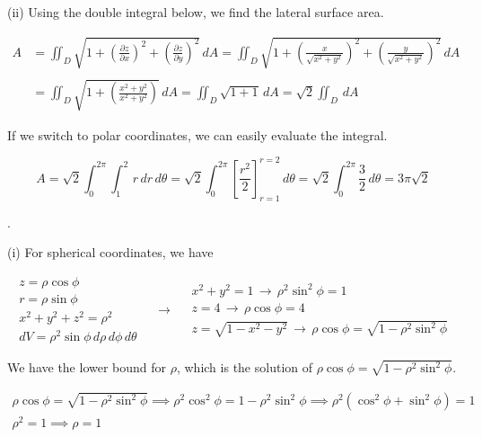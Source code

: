 \documentclass{article}
\begin{document}
\hfill

\noindent (ii) Using the double integral below, we find the lateral surface area.

\begin{align*}
A&=\iint_D\sqrt{1+\left(\frac{\partial z}{\partial x}\right)^2 +\left(\frac{\partial z}{\partial y}\right)^2}\,dA= \iint_D\sqrt{1+\left(\frac{x}{\sqrt{x^2+y^2}}\right)^2 +\left(\frac{y}{\sqrt{x^2+y^2}}\right)^2}\,dA \\\\&=\iint_D\sqrt{1+\left(\frac{x^2+y^2}{x^2+y^2}\right)}\,dA=\iint_D\sqrt{1+1}\,dA=\sqrt{2}\iint_D\,dA
\end{align*}

\hfill

\noindent If we switch to polar coordinates, we can easily evaluate the integral.

\begin{equation*}A=\sqrt2\int_0^{2\pi}\int_1^2\,r\,dr\,d\theta=\sqrt2\int_0^{2\pi}\left[\frac{r^2}2\right]_{r=1}^{r=2}\,d\theta=\sqrt2\int_0^{2\pi}\frac32\,d\theta=\boxed{3\pi\sqrt2}\end{equation*}

\newpage

.

\hfill

\noindent (i) For spherical coordinates, we have

\[
\begin{array}{c}
z=\rho\cos\phi\\
r=\rho\sin\phi\\
x^2+y^2+z^2=\rho^2\\
dV=\rho^2\sin\phi\,d\rho\,d\phi\,d\theta
\end{array}\quad\rightarrow\quad
\begin{array}{c}
x^2+y^2=1\,\rightarrow\,\rho^2\sin^2\phi = 1\\
z=4\,\rightarrow\,\rho\cos\phi=4\\
z=\sqrt{1-x^2-y^2}\,\rightarrow\,\rho\cos\phi=\sqrt{1-\rho^2\sin^2\phi}
\end{array}
\]

\hfill

\noindent We have the lower bound for $\rho$, which is the solution of $\rho\cos\phi=\sqrt{1-\rho^2\sin^2\phi}$.

\[
\begin{array}{c}
\rho\cos\phi=\sqrt{1-\rho^2\sin^2\phi}\implies\rho^2\cos^2\phi=1-\rho^2\sin^2\phi\implies
\rho^2\left(\cos^2\phi+\sin^2\phi\right)=1\\
\rho^2=1\implies\rho=1
\end{array}
\]
\end{document}
